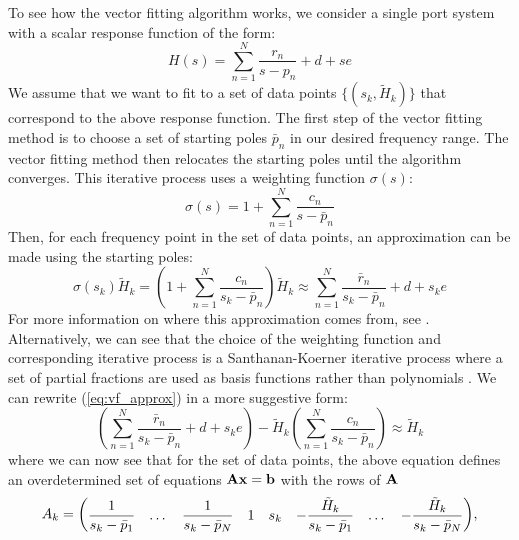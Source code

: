 To see how the vector fitting algorithm works, we consider a single port system with a scalar response function of the form:
\begin{equation}\label{eq:scalar_rational}
    H(s) = \sum_{n=1}^N \frac{r_n}{s-p_n} + d + se
\end{equation}
We assume that we want to fit to a set of data points $\{(s_k, \tilde{H}_k)\}$ that correspond to the above response function. The first step of the vector fitting method is to choose a set of starting poles $\bar{p}_n$ in our desired frequency range. The vector fitting method then relocates the starting poles until the algorithm converges. This iterative process uses a weighting function $\sigma(s)$:
\begin{equation}\label{eq:weight_function}
    \sigma(s) = 1 + \sum_{n=1}^N \frac{c_n}{s-\bar{p}_n}
\end{equation}
Then, for each frequency point in the set of data points, an approximation can be made using the starting poles:
\begin{equation}\label{eq:vf_approx}
    \sigma(s_k) \tilde{H}_k = \left(1 + \sum_{n=1}^N \frac{c_n}{s_k-\bar{p}_n}\right) \tilde{H}_k \approx \sum_{n=1}^N \frac{\bar{r}_n}{s_k-\bar{p}_n} + d + s_ke
\end{equation}
For more information on where this approximation comes from, see \cite{gustavsen_rational_1999}. Alternatively, we can see that the choice of the weighting function and corresponding iterative process is a Santhanan-Koerner iterative process where a set of partial fractions are used as basis functions rather than polynomials \cite[Chapter 7]{passive_macromodeling}. We can rewrite (\ref{eq:vf_approx}) in a more suggestive form:
\begin{equation}
    \left(\sum_{n=1}^N \frac{\bar{r}_n}{s_k-\bar{p}_n} + d + s_ke\right) - \tilde{H}_k\left(\sum_{n=1}^N \frac{c_n}{s_k-\bar{p}_n}\right) \approx \tilde{H}_k
\end{equation}
where we can now see that for the set of data points, the above equation defines an overdetermined set of equations $\vb{A} \vb{x} = \vb{b}$ with the rows of $\vb{A}$
\begin{equation}
    A_k = \mqty( \dfrac{1}{s_k-\bar{p}_1} & \dots & \dfrac{1}{s_k-\bar{p}_N} & 1 & s_k & -\dfrac{\tilde{H}_k}{s_k-\bar{p}_1} & \dots & -\dfrac{\tilde{H}_k}{s_k-\bar{p}_N} ),
\end{equation}
